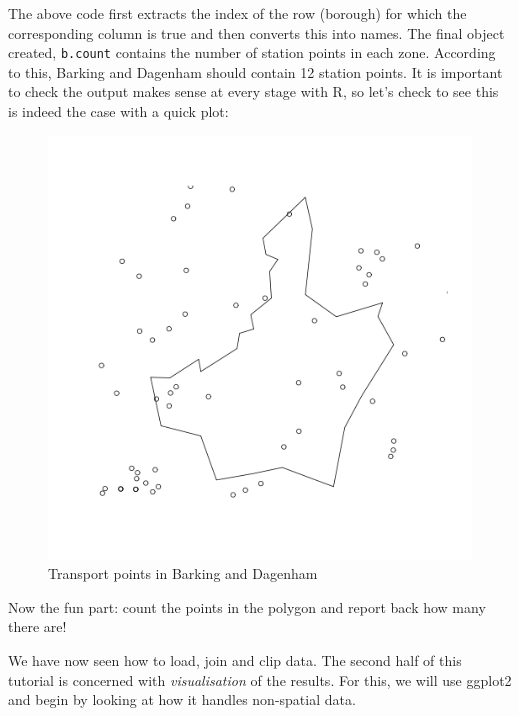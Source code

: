\documentclass[]{article}
\newenvironment{Shaded}{}{}
\newcommand{\KeywordTok}[1]{\textcolor[rgb]{0.00,0.44,0.13}{\textbf{{#1}}}}
\newcommand{\StringTok}[1]{\textcolor[rgb]{0.25,0.44,0.63}{{#1}}}
\newcommand{\NormalTok}[1]{{#1}}
\begin{document}
The above code first extracts the index of the row (borough) for which
the corresponding column is true and then converts this into names. The
final object created, \texttt{b.count} contains the number of station
points in each zone. According to this, Barking and Dagenham should
contain 12 station points. It is important to check the output makes
sense at every stage with R, so let's check to see this is indeed the
case with a quick plot:

\begin{Shaded}
\end{Shaded}

\begin{figure}[htbp]
\centering
\includegraphics{figure/Transport_points_in_Barking_and_Dagenham.png}
\caption{Transport points in Barking and Dagenham}
\end{figure}

Now the fun part: count the points in the polygon and report back how
many there are!

We have now seen how to load, join and clip data. The second half of
this tutorial is concerned with \emph{visualisation} of the results. For
this, we will use ggplot2 and begin by looking at how it handles
non-spatial data.
\end{document}
